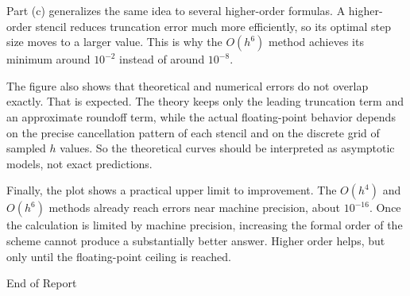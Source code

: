 \documentclass[12pt,a4paper]{article}
\begin{document}
Part (c) generalizes the same idea to several higher-order formulas. A higher-order stencil reduces truncation error much more efficiently, so its optimal step size moves to a larger value. This is why the $O(h^6)$ method achieves its minimum around $10^{-2}$ instead of around $10^{-8}$.

The figure also shows that theoretical and numerical errors do not overlap exactly. That is expected. The theory keeps only the leading truncation term and an approximate roundoff term, while the actual floating-point behavior depends on the precise cancellation pattern of each stencil and on the discrete grid of sampled $h$ values. So the theoretical curves should be interpreted as asymptotic models, not exact predictions.

Finally, the plot shows a practical upper limit to improvement. The $O(h^4)$ and $O(h^6)$ methods already reach errors near machine precision, about $10^{-16}$. Once the calculation is limited by machine precision, increasing the formal order of the scheme cannot produce a substantially better answer. Higher order helps, but only until the floating-point ceiling is reached.

\vfill
\begin{center}
{\fontsize{28}{32}\selectfont\calligra End of Report}
\end{center}
\vspace*{2em}
\end{document}
